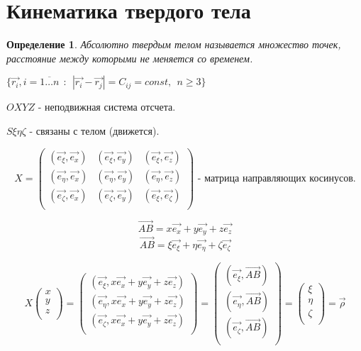 \documentclass{article}
\newtheorem*{df}{Определение}
\begin{document}
  
  \section{Кинематика твердого тела}
  \begin{df}
  Абсолютно твердым телом называется множество точек, расстояние между которыми не меняется со временем.
  
  $  \{ \vec{r_i}, i = \overline{1 \ldots n} ~~:~~|\vec{r_i} - \vec{r_j} | = C_{ij} = const ,~~ n \geqslant 3 \}$ 
  
  \end{df}
  
  $OXYZ$ - неподвижная система отсчета.
  
  $S\xi\eta\zeta$ - связаны с телом (движется).
 
  $$
  X = 
  \left(
  \begin{matrix} 
  (\vec{e_{\xi}}, \vec{e_{x}}) & 
  (\vec{e_{\xi}}, \vec{e_{y}}) & 
  (\vec{e_{\xi}}, \vec{e_{z}}) \\ 
  (\vec{e_{\eta}}, \vec{e_{x}}) & 
  (\vec{e_{\eta}}, \vec{e_{y}}) & 
  (\vec{e_{\eta}}, \vec{e_{z}}) \\  
  (\vec{e_{\zeta}}, \vec{e_{x}}) & 
  (\vec{e_{\zeta}}, \vec{e_{y}}) & 
  (\vec{e_{\xi}}, \vec{e_{\zeta}}) \\
  \end{matrix}
  \right)
  \text{ - матрица направляющих косинусов.}
  $$
 
  $$ \vec{AB} = x\vec{e_x} + y\vec{e_y} + z\vec{e_z} $$
  $$ \vec{AB} = \xi\vec{e_{\xi}} + \eta\vec{e_{\eta}} + \zeta\vec{e_{\zeta}} $$

  $$ X
  \left(
  \begin{matrix}
    x \\ y \\ z \\
  \end{matrix}
  \right)
  =
  \left(
  \begin{matrix}
  (\vec{e_{\xi}}, x\vec{e_x} + y \vec{e_y} + z \vec{e_z}) \\
  (\vec{e_{\eta}}, x\vec{e_x} + y \vec{e_y} + z \vec{e_z}) \\
  (\vec{e_{\zeta}}, x\vec{e_x} + y \vec{e_y} + z \vec{e_z}) \\
  \end{matrix}
  \right)
  = 
  \left(
  \begin{matrix}
  (\vec{e_{\xi}}, \vec{AB}) \\
  (\vec{e_{\eta}}, \vec{AB}) \\
  (\vec{e_{\zeta}}, \vec{AB}) \\
  \end{matrix}
  \right)
  =
  \left(
  \begin{matrix}
  \xi \\
  \eta \\
  \zeta \\
  \end{matrix}
  \right)
  =
  \vec{\rho}
  $$
\end{document}
